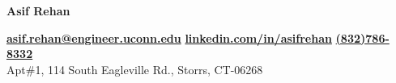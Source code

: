 \documentclass[margin]{res}%
\begin{document}
 
 
{ 
\raggedright \Large {\bf Asif Rehan} \leaders\vrule height 2.5pt depth -1.5pt \hfill \null\\
\raggedright 
\normalsize 	\Letter\hspace{0.05cm}\href{mailto:asif.rehan@engineer.uconn.edu}{ \bf asif.rehan@engineer.uconn.edu} \hspace{0.3cm} 	\faLinkedinSign \hspace{0.075cm}\href{http://www.linkedin.com/in/asifrehan/}{\bf linkedin.com/in/asifrehan} \hspace{0.3cm} \Mobilefone \hspace{0.075cm}\href{tel: 18327868332}{\bf (832)786-8332}\\
\small  Apt\small{\#1}, 114 South Eagleville Rd., Storrs, CT-06268}
\end{document}
